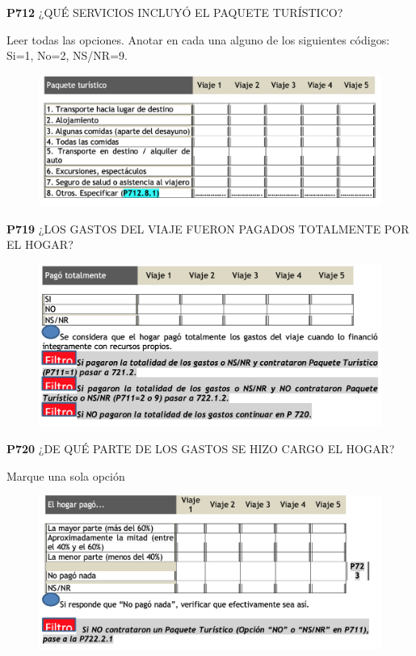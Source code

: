 \documentclass[
  openany]{book}
\begin{document}
\textbf{P712} ¿QUÉ SERVICIOS INCLUYÓ EL PAQUETE TURÍSTICO?

Leer todas las opciones. Anotar en cada una alguno de los siguientes códigos: Si=1, No=2, NS/NR=9.

\begin{figure}

{\centering \includegraphics[width=1\linewidth]{imagenes/figura6-247} 

}

\end{figure}

\textbf{P719} ¿LOS GASTOS DEL VIAJE FUERON PAGADOS TOTALMENTE POR EL HOGAR?

\begin{figure}

{\centering \includegraphics[width=1\linewidth]{imagenes/figura6-248} 

}

\end{figure}

\textbf{P720} ¿DE QUÉ PARTE DE LOS GASTOS SE HIZO CARGO EL HOGAR?

Marque una sola opción

\begin{figure}

{\centering \includegraphics[width=1\linewidth]{imagenes/figura6-249} 

}

\end{figure}
\end{document}
